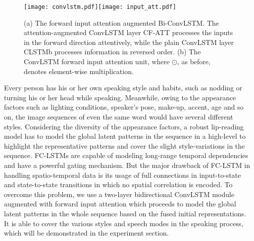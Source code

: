 \documentclass{bmvc2k}
\begin{document}
\begin{figure*}
  \centering
  \centerline{\texttt{[image: convlstm.pdf]}\texttt{[image: input\_att.pdf]}}
\caption{(a) The forward input attention augmented Bi-ConvLSTM. The attention-augmented ConvLSTM layer CF-ATT processes the inputs in the forward direction attentively, while the plain ConvLSTM layer CLSTMb processes information in reversed order. (b) The ConvLSTM forward input attention unit, where $\odot$, as before, denotes element-wise multiplication.}
\label{fig:convlstm}
\end{figure*}
Every person has his or her own speaking style and habits, such as nodding or turning his or her head while speaking. Meanwhile, owing to the appearance factors such as lighting conditions, speaker's pose, make-up, accent, age and so on, the image sequences of even the same word would have several different styles. Considering the diversity of the appearance factors, a robust lip-reading model has to model the global latent patterns in the sequence in a high-level to highlight the representative patterns and cover the slight style-variations in the sequence.
FC-LSTMs are capable of modeling long-range temporal dependencies and have a powerful gating mechanism. But the major drawback of FC-LSTM in handling spatio-temporal data is its usage of full connections in input-to-state and state-to-state transitions in which no spatial correlation is encoded. To overcome this problem, we use a two-layer bidirectional ConvLSTM module augmented with forward input attention which proceeds to model the global latent patterns in the whole sequence based on the fused initial representations. It is able to cover the various styles and speech modes in the speaking process, which will be demonstrated in the experiment section.
\end{document}
